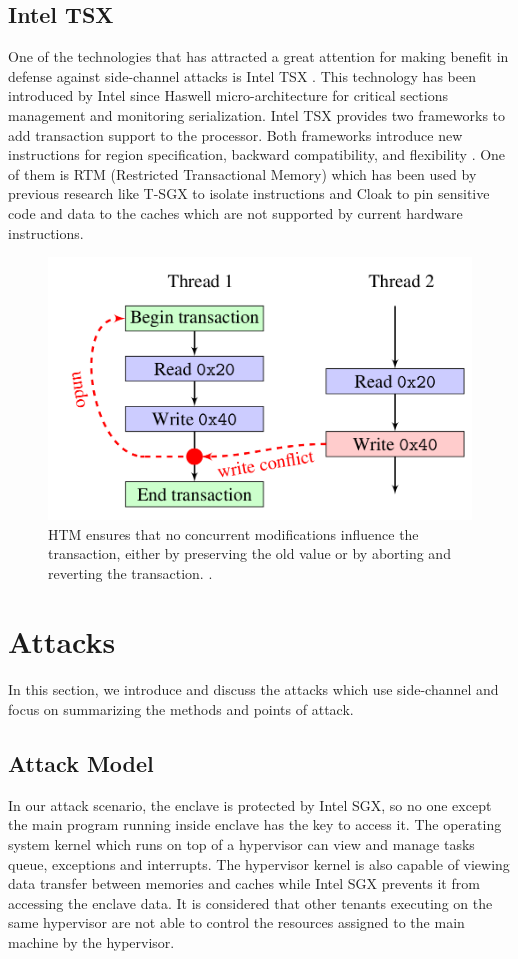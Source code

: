 \subsection{Intel TSX}
One of the technologies that has attracted a great attention for making benefit in defense against side-channel attacks is Intel TSX \cite{tsx}. This technology has been introduced by Intel since Haswell micro-architecture \cite{haswell} for critical sections management and monitoring serialization. Intel TSX provides two frameworks to add transaction support to the processor. Both frameworks introduce new instructions for region specification, backward compatibility, and flexibility \cite{tsx}. One of them is RTM (Restricted Transactional Memory) \cite{rtm} which has been used by previous research like T-SGX \cite{tsgx} to isolate instructions and Cloak \cite{cloak} to pin sensitive code and data to the caches which are not supported by current hardware instructions.

\begin{figure}
	\includegraphics[scale=0.2]{images/rtm}
	\caption{HTM ensures that no concurrent modifications influence the transaction, either by preserving the old value or by aborting and reverting the transaction. \cite{cloak}.}
	\label{fig:rtm}
\end{figure}


\section{Attacks}
In this section, we introduce and discuss the attacks which use side-channel and focus on summarizing the methods and points of attack.

\subsection{Attack Model}
In our attack scenario, the enclave is protected by Intel SGX, so no one except the main program running inside enclave has the key to access it. The operating system kernel which runs on top of a hypervisor can view and manage tasks queue, exceptions and interrupts. The hypervisor kernel is also capable of viewing data transfer between memories and caches while Intel SGX prevents it from accessing the enclave data. It is considered that other tenants executing on the same hypervisor are not able to control the resources assigned to the main machine by the hypervisor.

